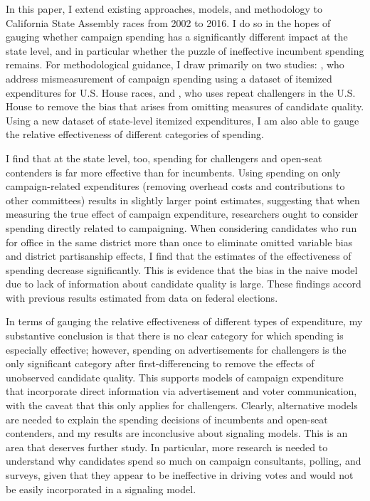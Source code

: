 \documentclass{article}
\begin{document}
In this paper, I extend existing approaches, models, and methodology to California State Assembly races from 2002 to 2016. I do so in the hopes of gauging whether campaign spending has a significantly different impact at the state level, and in particular whether the puzzle of ineffective incumbent spending remains. For methodological guidance, I draw primarily on two studies: \cite{ansolabehere1994mismeasure}, who address mismeasurement of campaign spending using a dataset of itemized expenditures for U.S. House races, and \cite{levitt-1994}, who uses repeat challengers in the U.S. House to remove the bias that arises from omitting measures of candidate quality. Using a new dataset of state-level itemized expenditures, I am also able to gauge the relative effectiveness of different categories of spending.

I find that at the state level, too, spending for challengers and open-seat contenders is far more effective than for incumbents. Using spending on only campaign-related expenditures (removing overhead costs and contributions to other committees) results in slightly larger point estimates, suggesting that when measuring the true effect of campaign expenditure, researchers ought to consider spending directly related to campaigning. When considering candidates who run for office in the same district more than once to eliminate omitted variable bias and district partisanship effects, I find that the estimates of the effectiveness of spending decrease significantly. This is evidence that the bias in the naive model due to lack of information about candidate quality is large. These findings accord with previous results estimated from data on federal elections.

In terms of gauging the relative effectiveness of different types of expenditure, my substantive conclusion is that there is no clear category for which spending is especially effective; however, spending on advertisements for challengers is the only significant category after first-differencing to remove the effects of unobserved candidate quality. This supports models of campaign expenditure that incorporate direct information via advertisement and voter communication, with the caveat that this only applies for challengers. Clearly, alternative models are needed to explain the spending decisions of incumbents and open-seat contenders, and my results are inconclusive about signaling models. This is an area that deserves further study. In particular, more research is needed to understand why candidates spend so much on campaign consultants, polling, and surveys, given that they appear to be ineffective in driving votes and would not be easily incorporated in a signaling model.
\end{document}
